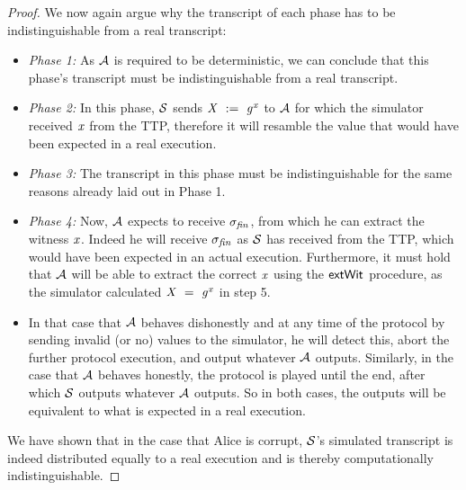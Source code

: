 \begin{proof}
    We now again argue why the transcript of each phase has to be indistinguishable from a real transcript:
    \begin{itemize}
        \item \textit{Phase 1:} As $\mathcal{A}$ is required to be deterministic, we can conclude that this phase's transcript must be indistinguishable from a real transcript.
        \item \textit{Phase 2:} In this phase, $\mathcal{S}$ sends $\mathit{X} ~:=~ \mathit{g}^{\mathit{x}}$ to $\mathcal{A}$ for which the simulator received $\mathit{x}$ from the TTP, therefore it will resamble the value that would have been expected in a real execution.
        \item \textit{Phase 3:} The transcript in this phase must be indistinguishable for the same reasons already laid out in Phase 1.
        \item \textit{Phase 4:} Now, $\mathcal{A}$ expects to receive $\sigma_{\mathit{fin}}$, from which he can extract the witness $\mathit{x}$.
        Indeed he will receive $\sigma_{\mathit{fin}}$ as $\mathcal{S}$ has received from the TTP, which would have been expected in an actual execution.
        Furthermore, it must hold that $\mathcal{A}$ will be able to extract the correct $\mathit{x}$ using the $\mathsf{extWit}$ procedure, as the simulator calculated $\mathit{X} ~=~ \mathit{g}^{\mathit{x}}$ in step 5.
        \item In that case that $\mathcal{A}$ behaves dishonestly and at any time of the protocol by sending invalid (or no) values to the simulator, he will detect this, abort the further protocol execution, and output whatever $\mathcal{A}$ outputs.
        Similarly, in the case that $\mathcal{A}$ behaves honestly, the protocol is played until the end, after which $\mathcal{S}$ outputs whatever $\mathcal{A}$ outputs.
        So in both cases, the outputs will be equivalent to what is expected in a real execution.
    \end{itemize}

    We have shown that in the case that Alice is corrupt, $\mathcal{S}$'s simulated transcript is indeed distributed equally to a real execution and is thereby computationally indistinguishable.


\end{proof}
